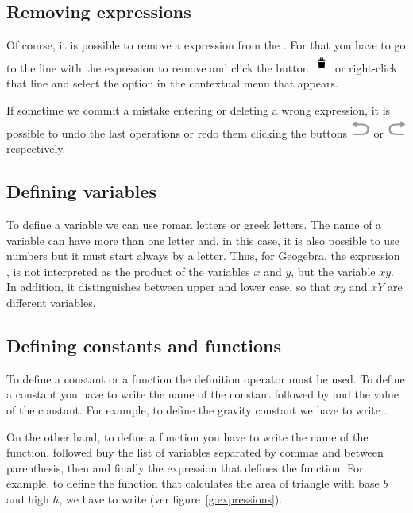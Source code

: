 \subsection*{Removing expressions}
Of course, it is possible to remove a expression from the .
For that you have to go to the line with the expression to remove and click the button \includegraphics[scale=0.035]{img/introduction/bin-button.png} or right-click that line and select the option  in the contextual menu that appears.

If sometime we commit a mistake entering or deleting a wrong expression, it is possible to undo the last operations or redo them clicking the buttons \includegraphics[scale=0.03]{img/introduction/undo-button.png} or \includegraphics[scale=0.03]{img/introduction/redo-button.png} respectively.


\subsection*{Defining variables}
To define a variable we can use roman letters or greek letters.
The name of a variable can have more than one letter and, in this case, it is also possible to use numbers but it must start always by a letter.
Thus, for Geogebra, the expression , is not interpreted as the product of the variables $x$ and $y$, but the variable $xy$.
In addition, it distinguishes between upper and lower case, so that $xy$ and $xY$ are different variables.


\subsection*{Defining constants and functions}
To define a constant or a function the definition operator \command{:=} must be used.
To define a constant you have to write the name of the constant followed by \command{:=} and the value of the constant.
For example, to define the gravity constant we have to write .

On the other hand, to define a function you have to write the name of the function, followed buy the list of variables separated by commas and between parenthesis, then \command{:=} and finally the expression that defines the function.
For example, to define the function that calculates the area of triangle with base $b$ and high $h$, we have to write  (ver figure~\ref{g:expressions}).


